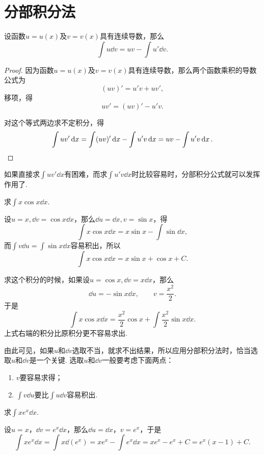 \section{分部积分法}
\begin{theorem}[分部积分公式]
设函数\(u=u(x)\)及\(v=v(x)\)具有连续导数，那么\[
\int u \dd{v} = uv - \int u' \dd{v}.
\]
\begin{proof}
因为函数\(u=u(x)\)及\(v=v(x)\)具有连续导数，那么两个函数乘积的导数公式为\[
(uv)' = u'v + uv',
\]移项，得\[
uv' = (uv)' - u'v.
\]

对这个等式两边求不定积分，得\[
\int u v' \dd{x} = \int (uv)' \dd{x} - \int u' v \dd{x}
= uv - \int u' v \dd{x}.
\qedhere
\]
\end{proof}
\end{theorem}
如果直接求\(\int u v' \dd{x}\)有困难，而求\(\int u' v \dd{x}\)时比较容易时，分部积分公式就可以发挥作用了.

\begin{example}
求\(\int x \cos x \dd{x}\).
\begin{solution}
设\(u = x, \dd{v} = \cos x \dd{x}\)，那么\(\dd{u} = \dd{x}, v = \sin x\)，得\[
\int x \cos x \dd{x}
= x \sin x - \int \sin \dd{x},
\]而\(\int v \dd{u} = \int \sin x \dd{x}\)容易积出，所以\[
\int x \cos x \dd{x} = x \sin x + \cos x + C.
\]

求这个积分的时候，如果设\(u = \cos x, \dd{v} = x \dd{x}\)，那么\[
\dd{u} = -\sin x \dd{x}, \qquad v = \frac{x^2}{2}.
\]于是\[
\int x \cos x \dd{x} = \frac{x^2}{2} \cos x + \int \frac{x^2}{2} \sin x \dd{x}.
\]上式右端的积分比原积分更不容易求出.
\end{solution}
\end{example}
由此可见，如果\(u\)和\(\dd{v}\)选取不当，就求不出结果，所以应用分部积分法时，恰当选取\(u\)和\(\dd{v}\)是一个关键.
选取\(u\)和\(\dd{v}\)一般要考虑下面两点：\begin{enumerate}
\item \(v\)要容易求得；
\item \(\int v \dd{u}\)要比\(\int u \dd{v}\)容易积出.
\end{enumerate}

\begin{example}
求\(\int x e^x \dd{x}\).
\begin{solution}
设\(u = x\)，\(\dd{v} = e^x \dd{x}\)，那么\(\dd{u} = \dd{x}\)，\(v = e^x\)，于是\[
\int x e^x \dd{x}
= \int x \dd(e^x)
= x e^x - \int e^x \dd{x}
= x e^x - e^x + C
= e^x (x - 1) + C.
\]
\end{solution}
\end{example}

